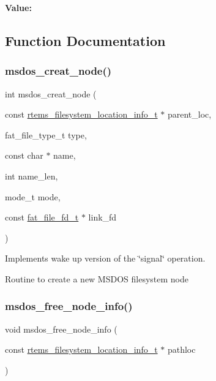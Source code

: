 {\bfseries Value\+:}
\begin{DoxyCode}{0}

\end{DoxyCode}


\subsection{Function Documentation}
\mbox{\label{group__libfs__msdos_gad3c1d9f2798d77cb8ec96f313e56a785}} 
\subsubsection{\texorpdfstring{msdos\_creat\_node()}{msdos\_creat\_node()}}
{\footnotesize\ttfamily int msdos\+\_\+creat\+\_\+node (\begin{DoxyParamCaption}\item[{const \mbox{\hyperlink{group__LibIO_ga3252b3d31ee3c49ffff0b7604a676864}{rtems\+\_\+filesystem\+\_\+location\+\_\+info\+\_\+t}} $\ast$}]{parent\+\_\+loc,  }\item[{fat\+\_\+file\+\_\+type\+\_\+t}]{type,  }\item[{const char $\ast$}]{name,  }\item[{int}]{name\+\_\+len,  }\item[{mode\+\_\+t}]{mode,  }\item[{const \mbox{\hyperlink{group__libfs__ff_gaa53f9c544914509505e3cfbd3796f877}{fat\+\_\+file\+\_\+fd\+\_\+t}} $\ast$}]{link\+\_\+fd }\end{DoxyParamCaption})}



Implements wake up version of the \char`\"{}signal\char`\"{} operation. 

Routine to create a new M\+S\+D\+OS filesystem node \mbox{\label{group__libfs__msdos_gac3300c45043a2ca7b0ddac74eadf7606}} 
\subsubsection{\texorpdfstring{msdos\_free\_node\_info()}{msdos\_free\_node\_info()}}
{\footnotesize\ttfamily void msdos\+\_\+free\+\_\+node\+\_\+info (\begin{DoxyParamCaption}\item[{const \mbox{\hyperlink{group__LibIO_ga3252b3d31ee3c49ffff0b7604a676864}{rtems\+\_\+filesystem\+\_\+location\+\_\+info\+\_\+t}} $\ast$}]{pathloc }\end{DoxyParamCaption})}



